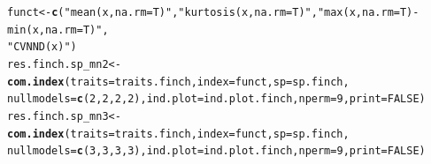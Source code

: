 \documentclass[12pt]{article}\usepackage[]{graphicx}\usepackage[]{color}
\makeatletter
\newcommand{\hlnum}[1]{\textcolor[rgb]{0.686,0.059,0.569}{#1}}%
\newcommand{\hlstr}[1]{\textcolor[rgb]{0.192,0.494,0.8}{#1}}%
\newcommand{\hlstd}[1]{\textcolor[rgb]{0.345,0.345,0.345}{#1}}%
\newcommand{\hlkwb}[1]{\textcolor[rgb]{0.69,0.353,0.396}{#1}}%
\newcommand{\hlkwc}[1]{\textcolor[rgb]{0.333,0.667,0.333}{#1}}%
\newcommand{\hlkwd}[1]{\textcolor[rgb]{0.737,0.353,0.396}{\textbf{#1}}}%
\newenvironment{kframe}{%
 \def\at@end@of@kframe{}%
 \ifinner\ifhmode%
  \def\at@end@of@kframe{\end{minipage}}%
  \begin{minipage}{\columnwidth}%
 \fi\fi%
 \def\FrameCommand##1{\hskip\@totalleftmargin \hskip-\fboxsep
 \colorbox{shadecolor}{##1}\hskip-\fboxsep
     \hskip-\linewidth \hskip-\@totalleftmargin \hskip\columnwidth}%
 \MakeFramed {\advance\hsize-\width
   \@totalleftmargin\z@ \linewidth\hsize
   \@setminipage}}%
 {\par\unskip\endMakeFramed%
 \at@end@of@kframe}
\newenvironment{knitrout}{}{} %
\makeatother
\begin{document}
\begin{knitrout}
\color{fgcolor}\begin{kframe}
\begin{alltt}
\hlstd{funct} \hlkwb{<-} \hlkwd{c}\hlstd{(}\hlstr{"mean(x, na.rm=T)"}\hlstd{,} \hlstr{"kurtosis(x, na.rm=T)"}\hlstd{,} \hlstr{"max(x, na.rm=T) - min(x, na.rm=T)"}\hlstd{,}
    \hlstr{"CVNND(x)"}\hlstd{)}
\hlstd{res.finch.sp_mn2} \hlkwb{<-} \hlkwd{com.index}\hlstd{(}\hlkwc{traits} \hlstd{= traits.finch,} \hlkwc{index} \hlstd{= funct,} \hlkwc{sp} \hlstd{= sp.finch,}
    \hlkwc{nullmodels} \hlstd{=} \hlkwd{c}\hlstd{(}\hlnum{2}\hlstd{,} \hlnum{2}\hlstd{,} \hlnum{2}\hlstd{,} \hlnum{2}\hlstd{),} \hlkwc{ind.plot} \hlstd{= ind.plot.finch,} \hlkwc{nperm} \hlstd{=} \hlnum{9}\hlstd{,} \hlkwc{print} \hlstd{=} \hlnum{FALSE}\hlstd{)}
\hlstd{res.finch.sp_mn3} \hlkwb{<-} \hlkwd{com.index}\hlstd{(}\hlkwc{traits} \hlstd{= traits.finch,} \hlkwc{index} \hlstd{= funct,} \hlkwc{sp} \hlstd{= sp.finch,}
    \hlkwc{nullmodels} \hlstd{=} \hlkwd{c}\hlstd{(}\hlnum{3}\hlstd{,} \hlnum{3}\hlstd{,} \hlnum{3}\hlstd{,} \hlnum{3}\hlstd{),} \hlkwc{ind.plot} \hlstd{= ind.plot.finch,} \hlkwc{nperm} \hlstd{=} \hlnum{9}\hlstd{,} \hlkwc{print} \hlstd{=} \hlnum{FALSE}\hlstd{)}
\end{alltt}
\end{kframe}
\end{knitrout}
\end{document}
